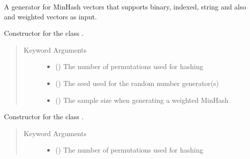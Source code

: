 \documentclass[letterpaper,10pt,english]{sphinxmanual}
\begin{document}
\begin{fulllineitems}
\label{\detokenize{documentation:tmap.Minhash}}
A generator for MinHash vectors that supports binary, indexed, string and also  and  weighted vectors as input.

Constructor for the class {\hyperref[\detokenize{documentation:tmap.Minhash}]{}}.
\begin{quote}\begin{description}
\item[{Keyword Arguments}] \leavevmode\begin{itemize}
\item {} 
 () \textendash{} The number of permutations used for hashing

\item {} 
 () \textendash{} The seed used for the random number generator(s)

\item {} 
 () \textendash{} The sample size when generating a weighted MinHash

\end{itemize}

\end{description}\end{quote}

\begin{fulllineitems}
\label{\detokenize{documentation:tmap.Minhash.__init__}}
Constructor for the class {\hyperref[\detokenize{documentation:tmap.Minhash}]{}}.
\begin{quote}\begin{description}
\item[{Keyword Arguments}] \leavevmode\begin{itemize}
\item {} 
 () \textendash{} The number of permutations used for hashing


\end{itemize}
\end{description}
\end{quote}
\end{fulllineitems}
\end{fulllineitems}
\end{document}
